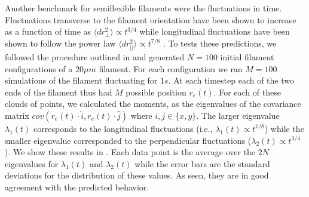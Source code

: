 \documentclass[12pt]{article}
\begin{document}
\par
Another benchmark for semiflexible filaments were the fluctuations in time. 
Fluctuations transverse to the filament orientation have been 
shown to increase as a function of time as $\langle dr_{\perp}^2\rangle\propto t^{3/4}$ while longitudinal fluctuations have been shown to follow the power law
$\langle dr_{||}^2\rangle\propto t^{7/8}$ \cite{everaers1999}. To tests these predictions, we followed the procedure outlined in
\cite{everaers1999} and generated $N = 100$ initial filament configurations of a $20\mu m$ filament. For each configuration
we ran $M = 100$ simulations of the filament fluctuating for $1s$. At each timestep each of the two ends of the
filament thus had $M$ possible position $r_e(t)$. For each of these clouds of points, we calculated
the moments, as the eigenvalues of the covariance matrix $cov(r_e(t)\cdot \hat{i},r_e(t)\cdot \hat{j})$ where
$i,j\in\{x,y\}$.
The larger eigenvalue $\lambda_1(t)$ corresponds to the longitudinal fluctuations
(i.e., $\lambda_1(t)\propto t^{7/8}$) while the smaller eigenvalue corresponded to the perpendicular fluctuations
($\lambda_2(t)\propto t^{3/4}$). We show these results in . Each data point is the
average over the $2N$ eigenvalues for $\lambda_1(t)$ and $\lambda_2(t)$ while the error bars are the standard deviations for the
distribution of these values. As seen, they are in good agreement with the predicted behavior. 
\end{document}
